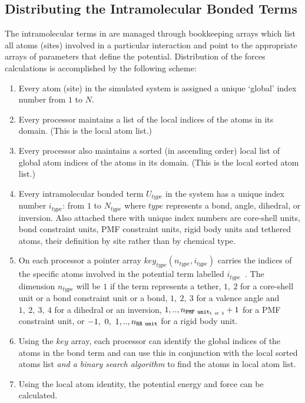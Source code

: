 \subsection{Distributing the Intramolecular Bonded Terms}

The intramolecular
terms in \D are managed through bookkeeping arrays which
list all atoms (sites) involved in a particular interaction
and point to the appropriate arrays of parameters that define
the potential.  Distribution of the forces calculations
is accomplished by the following scheme:
\begin{enumerate}
\item Every atom (site) in the simulated system is assigned a
unique `global' index number from $1$ to $N$.
\item Every processor maintains a list of the local indices of
the atoms in its domain.  (This is the local atom list.)
\item Every processor also maintains a sorted (in ascending order)
local list of global atom indices of the atoms in its domain.
(This is the local sorted atom list.)
\item Every intramolecular bonded term $U_{type}$ in the system has a unique index
number $i_{type}$: from $1$ to $N_{type}$ where $type$ represents a
bond, angle,
dihedral, or inversion.
Also attached there with unique index numbers are
core-shell units,
bond constraint units,
PMF constraint units,
rigid body units and
tethered atoms,
their definition by site rather than by chemical type.
\item On each processor a pointer array
$key_{type}(n_{type},i_{type})$ carries the indices of the
specific atoms involved in the potential term labelled
$i_{type}$~.  The dimension $n_{type}$ will be $1$ if the
term represents a tether, $1,~2$
for a core-shell unit or
a bond constraint unit or a
bond, $1,~2,~3$ for a valence
angle and $1,~2,~3,~4$ for a
dihedral or an
inversion, $1,..,n_{\tt PMF~unit_{1~or~2}}+1$
for a PMF constraint unit, or
$-1,~0,~1,..,n_{\tt RB~unit}$ for a rigid body unit.
\item Using the $key$ array, each processor can identify the global
indices of the atoms in the bond term and can use this in
conjunction with the local sorted atoms list {\em and a binary
search algorithm} to find the atoms in local atom list.
\item Using the local atom identity, the potential energy and force
can be calculated.
\end{enumerate}

